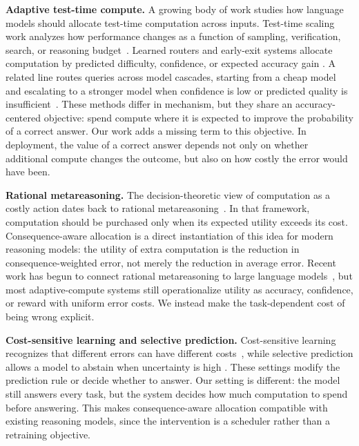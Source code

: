 \documentclass{article}
\begin{document}
\textbf{Adaptive test-time compute.}
A growing body of work studies how language models should allocate
test-time computation across inputs. Test-time scaling work analyzes
how performance changes as a function of sampling, verification,
search, or reasoning budget~\citep{snell2024scaling}. Learned
routers and early-exit systems allocate computation by predicted
difficulty, confidence, or expected accuracy gain
\citep{damani2024learning,manvi2024adaptive,qu2026adaptivetesttime}.
A related line routes queries across model cascades, starting from a
cheap model and escalating to a stronger model when confidence is low
or predicted quality is insufficient~\citep{chen2023frugalgpt,
aggarwal2024automix,ong2024routellm,ding2024hybrid}. These methods
differ in mechanism, but they share an accuracy-centered objective:
spend compute where it is expected to improve the probability of a
correct answer. Our work adds a missing term to this objective. In
deployment, the value of a correct answer depends not only on whether
additional compute changes the outcome, but also on how costly the
error would have been.

\textbf{Rational metareasoning.}
The decision-theoretic view of computation as a costly action dates
back to rational metareasoning~\citep{russell1991right,
hay2012selecting}. In that framework, computation should be purchased
only when its expected utility exceeds its cost. Consequence-aware
allocation is a direct instantiation of this idea for modern reasoning
models: the utility of extra computation is the reduction in
consequence-weighted error, not merely the reduction in average error.
Recent work has begun to connect rational metareasoning to large
language models~\citep{yang2024rational}, but most adaptive-compute
systems still operationalize utility as accuracy, confidence, or reward
with uniform error costs. We instead make the task-dependent cost of
being wrong explicit.

\textbf{Cost-sensitive learning and selective prediction.}
Cost-sensitive learning recognizes that different errors can have
different costs~\citep{elkan2001foundations}, while selective
prediction allows a model to abstain when uncertainty is high
\citep{geifman2017selective}. These settings modify the prediction
rule or decide whether to answer. Our setting is different: the model
still answers every task, but the system decides how much computation
to spend before answering. This makes consequence-aware allocation
compatible with existing reasoning models, since the intervention is a
scheduler rather than a retraining objective.
\end{document}
